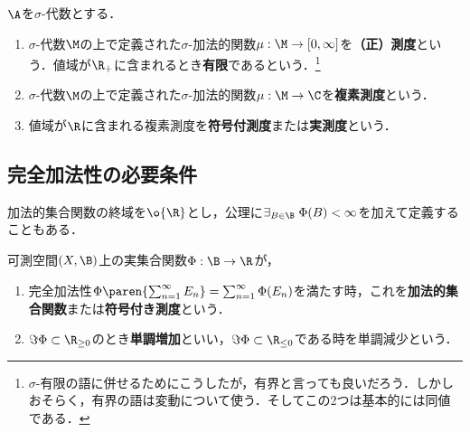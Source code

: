 \documentclass[uplatex, dvipdfmx]{jsreport}
\begin{document}
\begin{tcolorbox}[colframe=ForestGreen, colback=ForestGreen!10!white,breakable,colbacktitle=ForestGreen!40!white,coltitle=black,fonttitle=\bfseries\sffamily,
    title=]
    \begin{definition}
        $\A$を$\sigma$-代数とする．
        \begin{enumerate}
            \item $\sigma$-代数$\M$の上で定義された$\sigma$-加法的関数$\mu:\M\to[0,\infty]$を\textbf{（正）測度}という．値域が$\R_+$に含まれるとき\textbf{有限}であるという．\footnote{$\sigma$-有限の語に併せるためにこうしたが，有界と言っても良いだろう．しかしおそらく，有界の語は変動について使う．そしてこの2つは基本的には同値である．}
            \item $\sigma$-代数$\M$の上で定義された$\sigma$-加法的関数$\mu:\M\to\C$を\textbf{複素測度}という．
            \item 値域が$\R$に含まれる複素測度を\textbf{符号付測度}または\textbf{実測度}という．
        \end{enumerate}
    \end{definition}
\end{tcolorbox}

\subsection{完全加法性の必要条件}

\begin{tcolorbox}[colframe=ForestGreen, colback=ForestGreen!10!white,breakable,colbacktitle=ForestGreen!40!white,coltitle=black,fonttitle=\bfseries\sffamily,
title=]
    加法的集合関数の終域を$\o{\R}$とし，公理に$\exists_{B\in\B}\;\Phi(B)<\infty$を加えて定義することもある\cite{吉田耕作}．
\end{tcolorbox}

\begin{definition}
    可測空間$(X,\B)$上の実集合関数$\Phi:\B\to\R$が，
    \begin{enumerate}
        \item 完全加法性$\Phi\paren{\sum^\infty_{n=1}E_n}=\sum^\infty_{n=1}\Phi(E_n)$を満たす時，これを\textbf{加法的集合関数}または\textbf{符号付き測度}という．
        \item $\Im\Phi\subset\R_{\ge 0}$のとき\textbf{単調増加}といい，$\Im\Phi\subset\R_{\le 0}$である時を単調減少という．
    \end{enumerate}
\end{definition}
\end{document}
